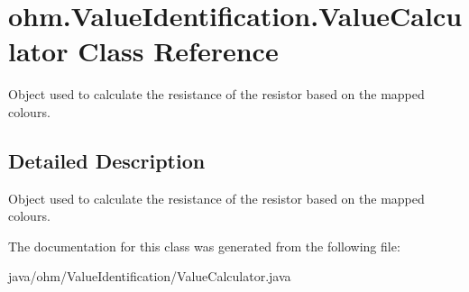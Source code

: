 \hypertarget{classohm_1_1_value_identification_1_1_value_calculator}{}\section{ohm.\+Value\+Identification.\+Value\+Calculator Class Reference}
\label{classohm_1_1_value_identification_1_1_value_calculator}


Object used to calculate the resistance of the resistor based on the mapped colours.  




\subsection{Detailed Description}
Object used to calculate the resistance of the resistor based on the mapped colours. 

The documentation for this class was generated from the following file\+:\begin{DoxyCompactItemize}
\item 
java/ohm/\+Value\+Identification/Value\+Calculator.\+java\end{DoxyCompactItemize}
